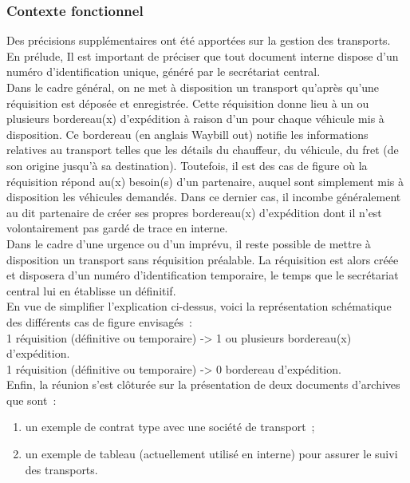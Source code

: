 \documentclass[11pt,fleqn]{report}
\begin{document}
\subsubsection{Contexte fonctionnel}
Des précisions supplémentaires ont été apportées sur la gestion des transports.
\\
En prélude, Il est important de préciser que tout document interne dispose d'un numéro d'identification unique, généré par le secrétariat central.
\\
Dans le cadre général, on ne met à disposition un transport qu'après qu'une réquisition est déposée et enregistrée. Cette réquisition donne lieu à un ou plusieurs bordereau(x) d'expédition à raison d'un pour chaque véhicule mis à disposition. Ce bordereau (en anglais Waybill out) notifie les informations relatives au transport telles que les détails du chauffeur, du véhicule, du fret (de son origine jusqu'à sa destination). Toutefois, il est des cas de figure où la réquisition répond au(x) besoin(s) d'un partenaire, auquel sont simplement mis à disposition les véhicules demandés. Dans ce dernier cas, il incombe généralement au dit partenaire de créer ses propres bordereau(x) d'expédition dont il n'est volontairement pas gardé de trace en interne.
\\
Dans le cadre d'une urgence ou d'un imprévu, il reste possible de mettre à disposition un transport sans réquisition préalable. La réquisition est alors créée et disposera d'un  numéro d'identification temporaire, le temps que le secrétariat central lui en établisse un définitif.
\\
En vue de simplifier l'explication ci-dessus, voici la représentation schématique des différents cas de figure envisagés~:
\\
1 réquisition (définitive ou temporaire) -> 1 ou plusieurs bordereau(x) d'expédition.
\\
1 réquisition (définitive ou temporaire) -> 0 bordereau d'expédition.
\\
Enfin, la réunion s'est clôturée sur la présentation de deux documents d'archives que sont~:
\begin{enumerate}
	\item un exemple de contrat type avec une société de transport~;
	\item un exemple de tableau (actuellement utilisé en interne) pour assurer le suivi des transports.
\end{enumerate}
\end{document}
